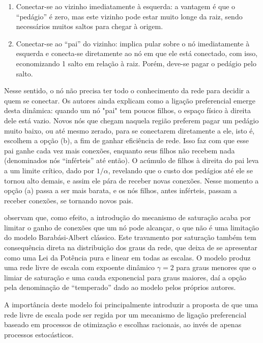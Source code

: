 \documentclass[12pt,oneside,a4paper,brazil,sumario=tradicional]{abntex2}
\begin{document}
\begin{enumerate}
  \item Conectar-se ao vizinho imediatamente à esquerda: a vantagem é que o “pedágio” é zero, mas este vizinho pode estar muito longe da raiz, sendo necessários muitos saltos para chegar à origem.
  \item Conectar-se ao “pai” do vizinho: implica pular sobre o nó imediatamente à esquerda e conecta-se diretamente ao nó em que ele está conectado, com isso, economizando 1 salto em relação à raiz. Porém, deve-se pagar o pedágio pelo salto.
\end{enumerate}
Nesse sentido, o nó não precisa ter todo o conhecimento da rede para decidir a quem se conectar. Os autores ainda explicam como a ligação preferencial emerge desta dinâmica: quando um nó "pai" tem poucos filhos, o espaço físico à direita dele está vazio. Novos nós que chegam naquela região preferem pagar um pedágio muito baixo, ou até mesmo zerado,  para se conectarem diretamente a ele, isto é, escolhem a opção (b), a fim de ganhar eficiência de rede. Isso faz com que esse pai ganhe cada vez mais conexões, enquanto seus filhos não recebem nada (denominados nós “inférteis” até então). O acúmulo de filhos à direita do pai leva a um limite crítico, dado por $1/\alpha$, revelando que o custo dos pedágios até ele se tornou alto demais, e assim ele pára de receber novas conexões. Nesse momento a opção (a) passa a ser mais barata, e os nós filhos, antes inférteis, passam a receber conexões, se tornando novos pais.

 observam que, como efeito, a introdução do mecanismo de saturação acaba por limitar o ganho de conexões que um nó pode alcançar, o que não é uma limitação do modelo Barabási-Albert clássico. Este travamento por saturação também tem consequência direta na distribuição dos graus da rede, que deixa de se apresentar como uma Lei da Potência pura e linear em todas as escalas. O modelo produz uma rede livre de escala com expoente dinâmico $\gamma = 2$ para graus menores que o limiar de saturação e uma cauda exponencial para graus maiores, daí a opção pela denominação de “temperado” dado ao modelo pelos próprios autores.

A importância deste modelo foi principalmente introduzir a proposta de que uma rede livre de escala pode ser regida por um mecanismo de ligação preferencial baseado em processos de otimização e escolhas racionais, ao invés de apenas processos estocásticos.
\end{document}
